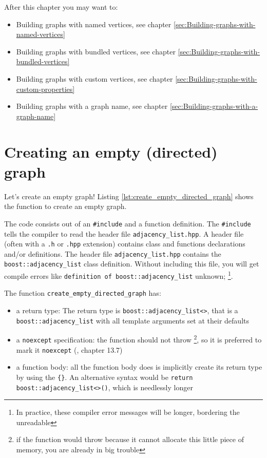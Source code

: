 After this chapter you may want to:

\begin{itemize}
  \item Building graphs with named vertices, 
    see chapter \ref{sec:Building-graphs-with-named-vertices}
  \item Building graphs with bundled vertices, 
    see chapter \ref{sec:Building-graphs-with-bundled-vertices}
  \item Building graphs with custom vertices,
    see chapter \ref{sec:Building-graphs-with-custom-properties}
  \item Building graphs with a graph name,
    see chapter \ref{sec:Building-graphs-with-a-graph-name}
\end{itemize}

\section{Creating an empty (directed) graph}
\label{subsec:create_empty_directed_graph}

Let's create an empty graph! 
Listing \ref{lst:create_empty_directed_graph} 
shows the function to create an empty graph.



The code consists out of an \verb;#include; and a function definition.
The \verb;#include; tells the compiler 
to read the header file \verb;adjacency_list.hpp;.
A header file (often with a \verb;.h; or \verb;.hpp; extension) 
contains class and functions declarations and/or definitions.
The header file \verb;adjacency_list.hpp; contains the 
\verb;boost::adjacency_list; class definition.
Without including this file, you will get compile errors like 
\verb;definition of boost::adjacency_list; unknown;
\footnote{
  In practice, these compiler error messages will be longer, bordering the unreadable
}. 

The function \verb;create_empty_directed_graph; has:

\begin{itemize}
  \item a return type: 
    The return type is \verb;boost::adjacency_list<>;, 
    that is a \verb;boost::adjacency_list; 
    with all template arguments set at their defaults
  \item a \verb;noexcept; specification: 
    the function should not throw
    \footnote{
      if the function would throw because it cannot allocate this little piece
      of memory, you are already in big trouble
    }, so it is preferred to mark it \verb;noexcept; 
    (\cite{stroustrup2013}, chapter 13.7)
  \item a function body: 
    all the function body does is implicitly create its return
    type by using the \verb;{};.
    An alternative syntax would be \verb;return boost::adjacency_list<>();,
    which is needlessly longer
\end{itemize}

